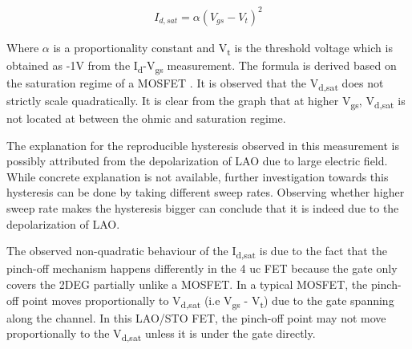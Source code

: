 \documentclass[11pt,a4paper]{report}
\begin{document}
\begin{align}
    I_{d,sat} = \alpha(V_{gs} - V_t)^2 \label{eq:saturation_eq}
\end{align}

Where $\alpha$ is a proportionality constant and V\textsubscript{t} is the threshold voltage which is obtained as -1V from the I\textsubscript{d}-V\textsubscript{gs} measurement. The formula is derived based on the saturation regime of a MOSFET \cite{Semiconductor_explained_more}. It is observed that the V\textsubscript{d,sat} does not strictly scale quadratically. It is clear from the graph that at higher V\textsubscript{gs}, V\textsubscript{d,sat} is not located at between the ohmic and saturation regime. 


The explanation for the reproducible hysteresis observed in this measurement is possibly attributed from the depolarization of LAO due to large electric field. While concrete explanation is not available, further investigation towards this hysteresis can be done by taking different sweep rates. Observing whether higher sweep rate makes the hysteresis bigger can conclude that it is indeed due to the depolarization of LAO.

The observed non-quadratic behaviour of the I\textsubscript{d,sat} is due to the fact that the pinch-off mechanism happens differently in the 4 uc FET because the gate only covers the 2DEG partially unlike a MOSFET. In a typical MOSFET, the pinch-off point moves proportionally to V\textsubscript{d,sat} (i.e V\textsubscript{gs} - V\textsubscript{t}) due to the gate spanning along the channel. In this LAO/STO FET, the pinch-off point may not move proportionally to the V\textsubscript{d,sat} unless it is under the gate directly.



 
\end{document}

